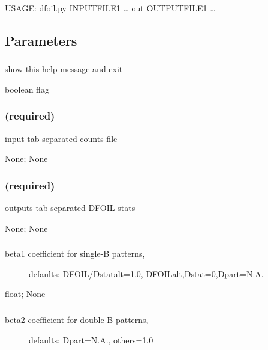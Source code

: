 \documentclass[letterpaper,12pt,english]{sphinxmanual}
\begin{document}
USAGE: dfoil.py INPUTFILE1 … \textendash{}out OUTPUTFILE1 …


\subsection{Parameters}
\label{\detokenize{prog_desc:parameters}}

\subsubsection{}
\label{\detokenize{prog_desc:h-help}}
 show this help message and exit

 boolean flag


\subsubsection{ (required)}
\label{\detokenize{prog_desc:infile-required}}
 input tab-separated counts file

 None;  None


\subsubsection{ (required)}
\label{\detokenize{prog_desc:out-required}}
 outputs tab-separated DFOIL stats

 None;  None


\subsubsection{}
\label{\detokenize{prog_desc:beta1}}\begin{description}
\item[{ beta1 coefficient for single-B patterns,}] \leavevmode
defaults: DFOIL/Dstatalt=1.0,
DFOILalt,Dstat=0,Dpart=N.A.

\end{description}

 float;  None


\subsubsection{}
\label{\detokenize{prog_desc:beta2}}\begin{description}
\item[{ beta2 coefficient for double-B patterns,}] \leavevmode
defaults: Dpart=N.A., others=1.0

\end{description}
\end{document}
